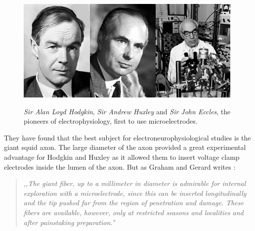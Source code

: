 \begin{figure}
\centering
\includegraphics[height=5cm, keepaspectratio]{img/theory/hodgkin.jpg}\includegraphics[height=5cm, keepaspectratio]{img/theory/huxley.jpg}\includegraphics[height=5cm, keepaspectratio]{img/theory/eccles.jpg}
\caption[The pioneers of electrophysiology, the first to use microelectrodes.]{\emph{Sir Alan Loyd Hodgkin}, \emph{Sir Andrew Huxley} and \emph{Sir John Eccles}, the pioneers of electrophysiology, first to use microelectrodes.}
\label{fig:pioneers}
\end{figure}

They have found that the best subject for electroneurophysiological studies is the giant squid axon.
The large diameter of the axon provided a great experimental advantage for Hodgkin and Huxley as it allowed them to insert voltage clamp electrodes inside the lumen of the axon.
But as Graham and Gerard writes \cite{graham1946judith}:

\begin{quote}
\vspace{0.5cm}
\emph{,,The giant fiber, up to a millimeter in diameter is admirable for internal exploration with a microelectrode, since this can be inserted longitudinally and the tip pushed far from the region of penetration and damage.
These fibers are available, however, only at restricted seasons and localities and after painstaking preparation.''}
\vspace{0.5cm}
\end{quote}

